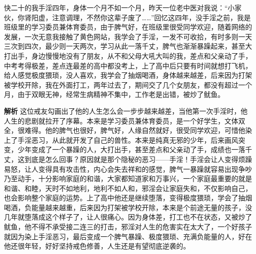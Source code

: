 \begin{case}
    快二十的我手淫四年，身体一个月不如一个月，昨天一位老中医对我说：“小家伙，你肾阳虚，注意调理，不然你这辈子废了……”回忆这四年，没手淫之前，我是班级里的学习委员兼体育委员，由于脾气好，在班级里很受同学欢迎，随着网络的发展，一次无意我接触了黄色网站，我学会了手淫，一发不可收拾，有时多则一天三次到四次，最少则一天两次，学习从此一落千丈，脾气也渐渐暴躁起来，甚至大打出手，身边慢慢地没有了朋友，从不和父母大吼大叫的我，差点和父亲动了手，中考考得极差，差点连最差的高中都没考上，上了高中后只要有时间就想打飞机，给人感觉极度猥琐，没人喜欢，我学会了抽烟喝酒，身体越来越差，后来因为打架被学校开除，我在外面打工，两年过去了，期间交了几个女朋友，都没有超过一个月，由于双眼无神，经常生病精神不集中，工作老是出错，被炒了鱿鱼。

    \textbf{解析} 这位戒友勾画出了他的人生怎么会一步步越来越差，当他第一次手淫时，他人生的悲剧就拉开了序幕。本来是学习委员兼体育委员，是一个好学生，文体双全，很难得。他的脾气也很好，脾气好，人缘自然就好，很受同学欢迎，可惜他染上了手淫恶习，从此就开发了自己的兽性。本来是纯真无邪的少年，后来画风突变，少年变成了一个暴躁的人，大打出手，甚至差点和父亲动了手，成绩也一落千丈，这到底是怎么回事？原因就是那个隐秘的恶习——手淫！手淫会让人变得烦躁易怒，让人变得具有攻击性，内心会失去祥和的感觉，脾气一暴躁就容易出现争吵乃至动手，十分影响家庭的和谐，大家都知道家和万事兴，一个家庭最重要的就是和谐、和睦，天时不如地利，地利不如人和，邪淫会让家庭失和，不仅影响自己，也会影响整个家庭的运势。上了高中他还是继续堕落，变得极度猥琐，学会了抽烟喝酒，负能量越来越重，后来因为打架被学校开除，本来是个前途无量的孩子，没几年就堕落成这个样子了，让人很痛心。因为身体差，打工也不在状态，又被炒了鱿鱼，他不得不承受接二连三的打击，邪淫对人生的危害实在太大了，一个好孩子就因为染上手淫恶习，最后变成一个脾气暴躁、极度猥琐、充满负能量的人，好在他还很年轻，好好坚持戒色修善，人生还是有望彻底逆袭的。
\end{case}

